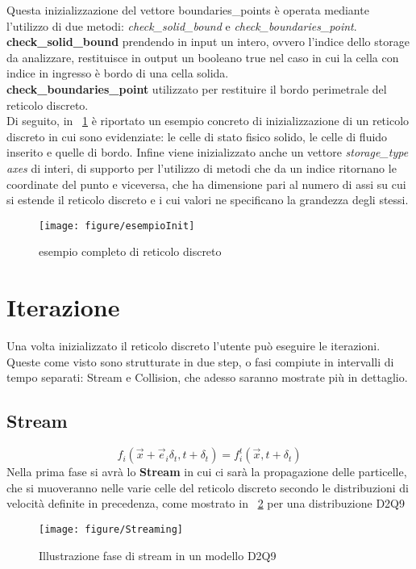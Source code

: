 {Questa inizializzazione del vettore boundaries\_points \`e operata mediante l'utilizzo di due metodi: \textit{check\_solid\_bound} e \textit{check\_boundaries\_point}.\\
\textbf{check\_solid\_bound} prendendo in input un intero, ovvero l'indice dello storage da analizzare, restituisce in output un booleano true nel caso in cui la cella con indice in ingresso \`e bordo di una cella solida.\\
\textbf{check\_boundaries\_point} utilizzato per restituire il bordo perimetrale del reticolo discreto.\\
Di seguito, in \figurename~\ref{fig:esempioInit}  \`e riportato un esempio concreto di inizializzazione di un reticolo discreto in cui sono evidenziate: le celle di stato fisico solido, le celle di fluido inserito e quelle di bordo. Infine viene inizializzato anche un vettore \textit{storage\_type axes} di interi, di supporto per l'utilizzo di metodi che da un indice ritornano le coordinate del punto e viceversa, che ha dimensione pari al numero di assi su cui si estende il reticolo discreto e i cui valori ne specificano la grandezza degli stessi.

\begin{figure}[!htb]
	\begin{center}
		\texttt{[image: figure/esempioInit]}
	\end{center}
	\caption{esempio completo di reticolo discreto \label{fig:esempioInit}}
\end{figure}\hfill

\section{Iterazione}
Una volta inizializzato il reticolo discreto l'utente pu\`o eseguire le iterazioni. Queste come visto sono strutturate in due step, o fasi compiute in intervalli di tempo separati: Stream e Collision, che adesso saranno mostrate pi\`u in dettaglio.
\subsection{Stream}
$$f_{i}({\vec {x}}+{\vec {e}}_{i}\delta _{t},t+\delta _{t})=f_{i}^{t}({\vec {x}},t+\delta _{t}) $$
Nella prima fase si avr\`a lo \textbf{Stream} in cui ci sar\`a la propagazione delle particelle, che si muoveranno nelle varie celle del reticolo discreto secondo le distribuzioni di velocit\`a definite in precedenza, come mostrato in \figurename~\ref{fig:Streaming} per una distribuzione D2Q9%
\begin{figure}[!htb]
	\begin{center}
		\texttt{[image: figure/Streaming]}
	\end{center}
	\caption{Illustrazione fase di stream in un modello D2Q9 \label{fig:Streaming}}
\end{figure}\hfill

}
